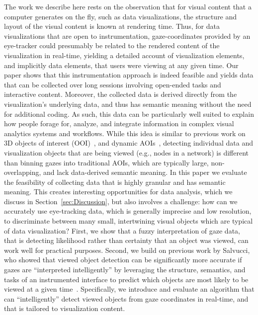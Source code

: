 The work we describe here rests on the observation that for visual content that a computer generates on the fly, such as data visualizations, the structure and layout of the visual content is known at rendering time. Thus, for data visualizations that are open to instrumentation, gaze-coordinates provided by an eye-tracker could presumably be related to the rendered content of the visualization in real-time, yielding a detailed account of visualization elements, and implicitly data elements, that users were viewing at any given time. Our paper shows that this instrumentation approach is indeed feasible and yields data that can be collected over long sessions involving open-ended tasks and interactive content. Moreover, the collected data is derived directly from the visualization's underlying data, and thus has semantic meaning without the need for additional coding. As such, this data can be particularly well suited to explain how people forage for, analyze, and integrate information in complex visual analytics systems and workflows. 
While this idea is similar to previous work on 3D objects of interest (OOI)~\cite{stellmach20103d}, and  dynamic AOIs~\cite{papenmeier2010dynaoi}, detecting individual data and visualization objects that are being viewed (e.g., nodes in a network) is different than binning gazes into traditional AOIs, which are typically large, non-overlapping, and lack data-derived semantic meaning. In this paper we evaluate the feasibility of collecting data that is highly granular and has semantic meaning. This creates interesting opportunities for data analysis, which we discuss in Section~\ref{sec:Discussion}, but also involves a challenge: how can we accurately use eye-tracking data, which is generally imprecise and low resolution, to discriminate between many small, intertwining visual objects which are typical of data visualization? First, we show that a fuzzy interpretation of gaze data, that is detecting likelihood rather than certainty that an object was viewed, can work well for practical purposes. Second, we build on previous work by Salvucci, who showed that viewed object detection can be significantly more accurate if gazes are ``interpreted intelligently'' by leveraging the structure, semantics, and tasks of an instrumented interface to predict which objects are most likely to be viewed at a given time~\cite{salvucci1999inferring, salvucci2000intelligent}. Specifically, we introduce and evaluate an algorithm that can ``intelligently'' detect viewed objects from gaze coordinates in real-time, and that is tailored to visualization content. 

